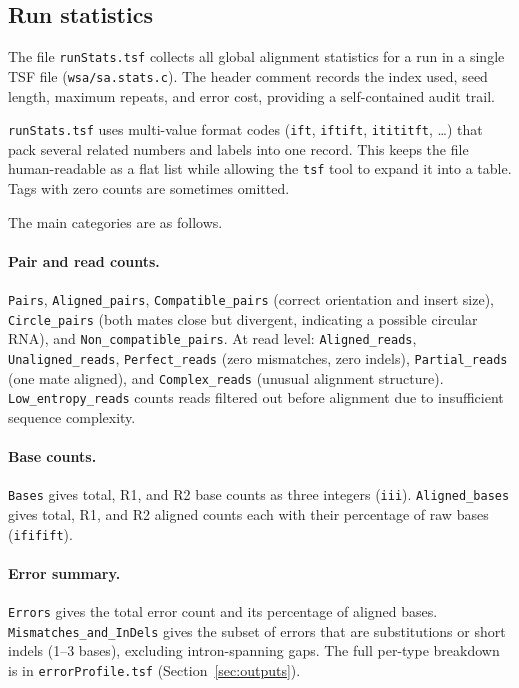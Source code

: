 \documentclass[11pt]{article}
\begin{document}
\subsection{Run statistics}
\label{sec:runstats}

The file \texttt{runStats.tsf} collects all global alignment
statistics for a run in a single TSF file (\texttt{wsa/sa.stats.c}).
The header comment records the index used, seed length, maximum
repeats, and error cost, providing a self-contained audit trail.

\texttt{runStats.tsf} uses
multi-value format codes (\texttt{ift}, \texttt{iftift},
\texttt{itititft}, \ldots) that pack several related numbers and
labels into one record.
This keeps the file human-readable as a flat list while allowing
the \texttt{tsf} tool to expand it into a table.
Tags with zero counts are sometimes omitted.

The main categories are as follows.

\paragraph{Pair and read counts.}
\texttt{Pairs}, \texttt{Aligned\_pairs}, \texttt{Compatible\_pairs}
(correct orientation and insert size), \texttt{Circle\_pairs}
(both mates close but divergent, indicating a possible circular RNA),
and \texttt{Non\_compatible\_pairs}.
At read level: \texttt{Aligned\_reads}, \texttt{Unaligned\_reads},
\texttt{Perfect\_reads} (zero mismatches, zero indels),
\texttt{Partial\_reads} (one mate aligned), and
\texttt{Complex\_reads} (unusual alignment structure).
\texttt{Low\_entropy\_reads} counts reads filtered out before
alignment due to insufficient sequence complexity.

\paragraph{Base counts.}
\texttt{Bases} gives total, R1, and R2 base counts as three integers
(\texttt{iii}).
\texttt{Aligned\_bases} gives total, R1, and R2 aligned counts
each with their percentage of raw bases (\texttt{ififift}).

\paragraph{Error summary.}
\texttt{Errors} gives the total error count and its percentage of
aligned bases.
\texttt{Mismatches\_and\_InDels} gives the subset of errors that
are substitutions or short indels (1--3 bases), excluding
intron-spanning gaps.
The full per-type breakdown is in \texttt{errorProfile.tsf}
(Section~\ref{sec:outputs}).
\end{document}
